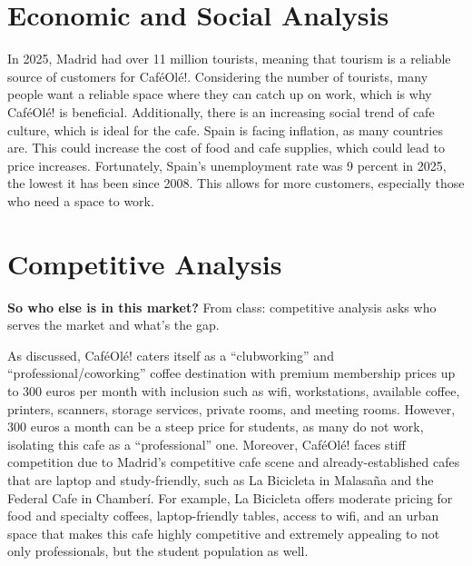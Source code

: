 \documentclass[12pt,a4paper]{article}
\begin{document}
\vspace{0.5em}
\noindent{\color{sectionblue}\rule{\textwidth}{0.4pt}}

\section*{\color{sectionblue}Economic and Social Analysis}\label{sec:economic}

In 2025, Madrid had over 11 million tourists, meaning that tourism is a reliable source of customers for Caf\'eOl\'e!. Considering the number of tourists, many people want a reliable space where they can catch up on work, which is why Caf\'eOl\'e! is beneficial. Additionally, there is an increasing social trend of cafe culture, which is ideal for the cafe. Spain is facing inflation, as many countries are. This could increase the cost of food and cafe supplies, which could lead to price increases. Fortunately, Spain's unemployment rate was 9 percent in 2025, the lowest it has been since 2008. This allows for more customers, especially those who need a space to work.

\vspace{0.5em}
\noindent{\color{sectionblue}\rule{\textwidth}{0.4pt}}

\section*{\color{sectionblue}Competitive Analysis}\label{sec:competition}

\textbf{So who else is in this market?} From class: competitive analysis asks who serves the market and what's the gap.

As discussed, Caf\'eOl\'e! caters itself as a ``clubworking'' and ``professional/coworking'' coffee destination with premium membership prices up to 300 euros per month with inclusion such as wifi, workstations, available coffee, printers, scanners, storage services, private rooms, and meeting rooms. However, 300 euros a month can be a steep price for students, as many do not work, isolating this cafe as a ``professional'' one. Moreover, Caf\'eOl\'e! faces stiff competition due to Madrid's competitive cafe scene and already-established cafes that are laptop and study-friendly, such as La Bicicleta in Malasa\~na and the Federal Cafe in Chamber\'i. For example, La Bicicleta offers moderate pricing for food and specialty coffees, laptop-friendly tables, access to wifi, and an urban space that makes this cafe highly competitive and extremely appealing to not only professionals, but the student population as well.
\end{document}
